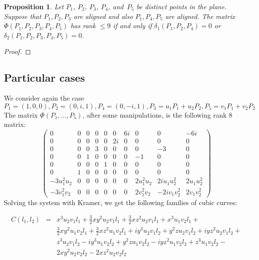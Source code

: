 \documentclass[12pt, a4paper, reqno, captions=tableheading,bibliography=totoc]{scrartcl}
\theoremstyle{plain}
\newtheorem{prop}[lemma]{Proposition}
\theoremstyle{definition}
\newcommand{\imunit}{i}
\begin{document}
\begin{prop}
 Let $P_1$, $P_2$, $P_3$, $P_4$, and~$P_5$ be distinct points in the plane.
 Suppose that $P_1, P_2, P_3$ are aligned and also $P_1, P_4, P_5$ are aligned.
 The matrix $\Phi(P_1, P_2, P_3, P_4, P_5)$ has rank $\leq 9$ if and only if $\delta_1(P_1, P_2, P_4) = 0$ or $\delta_2(P_1, P_2, P_3, P_4, P_5) = 0$.
\end{prop}
\begin{proof}

\end{proof}

\subsection{Particular cases}

We consider again the case
\[
P_1 = (1, 0, 0), P_2 = (0, i, 1), P_4 = (0, -i, 1), P_3 = u_1P_1+u_2P_2,
P_5 = v_1P_1+v_2P_2
\]
The matrix $\Phi(P_1, \dotsc, P_5)$,
after some manipulations, is the following rank 8 matrix:
\[
\left(\begin{array}{rrrrrrrrrr}
0 & 0 & 0 & 0 & 0 & 0 & 6 \imunit & 0 & 0 & -6 \imunit \\
0 & 0 & 0 & 0 & 0 & 2 \imunit & 0 & 0 & 0 & 0 \\
0 & 0 & 0 & 3 & 0 & 0 & 0 & 0 & -3 & 0 \\
0 & 0 & 1 & 0 & 0 & 0 & 0 & -1 & 0 & 0 \\
0 & 0 & 0 & 0 & 1 & 0 & 0 & 0 & 0 & 0 \\
0 & 1 & 0 & 0 & 0 & 0 & 0 & 0 & 0 & 0 \\
-3 u_{1}^{2} u_{2} & 0 & 0 & 0 & 0 & 0 & 0 & 2 u_{1}^{2} u_{2} & 2 \imunit u_{1} u_{2}^{2} & 2 u_{1} u_{2}^{2} \\
-3 v_{1}^{2} v_{2} & 0 & 0 & 0 & 0 & 0 & 0 & 2 v_{1}^{2} v_{2} & -2 \imunit v_{1} v_{2}^{2} & 2 v_{1} v_{2}^{2}
\end{array}\right)
\]
Solving the system with Kramer, we get the following families of
cubic curves:

\begin{eqnarray*}
  C(l_1, l_2) & = & x^{3} u_{2} v_{1} l_{1} + \frac{3}{2} x y^{2} u_{2} v_{1} l_{1} +
  \frac{3}{2} x z^{2} u_{2} v_{1} l_{1} + x^{3} u_{1} v_{2} l_{1} + \\
  & & \frac{3}{2} x y^{2} u_{1} v_{2} l_{1} + \frac{3}{2} x z^{2} u_{1} v_{2} l_{1} + \imunit y^{3} u_{2} v_{1} l_{2} + y^{2} z u_{2} v_{1} l_{2} +
  \imunit y z^{2} u_{2} v_{1} l_{2} + \\
  & & z^{3} u_{2} v_{1} l_{2} - \imunit y^{3} u_{1} v_{2} l_{2} + y^{2} z u_{1} v_{2} l_{2} -  \imunit y z^{2} u_{1} v_{2} l_{2} + z^{3} u_{1} v_{2} l_{2} - \\
  & & 2 x y^{2} u_{2} v_{2} l_{2} - 2 x z^{2} u_{2} v_{2} l_{2}
  \end{eqnarray*}
\end{document}
